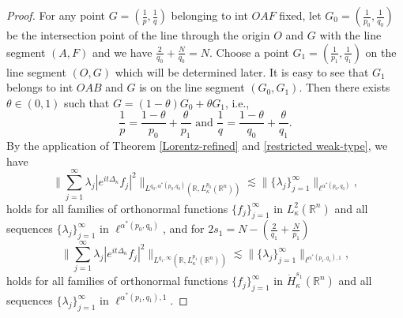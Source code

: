 \documentclass[a4paper,11pt, reqno]{amsart}
\numberwithin{equation}{section}
\theoremstyle{plain}
\theoremstyle{definition}
\theoremstyle{remark}
\begin{document}
\begin{proof}
    For any point $G=(\frac{1}{p},\frac{1}{q})$ belonging to int $OAF$ fixed, let $G_0=(\frac{1}{p_0},\frac{1}{q_0})$ be the intersection point of the line through the origin $O$ and $G$ with the line segment $(A,F)$ and we have $\frac{2}{q_0}+\frac{N}{q_0}=N$. Choose a point $G_1=(\frac{1}{p_1},\frac{1}{q_1})$ on the line segment $(O,G)$ which will be determined later. It is easy to see that $G_1$ belongs to int $OAB$ and $G$ is on the line segment $(G_0,G_1)$. Then there exists $\theta\in(0,1)$ such that $G=(1-\theta)G_0+\theta G_1$, i.e.,
    \begin{equation}\label{interpolation-index}
        \frac{1}{p}=\frac{1-\theta}{p_0}+\frac{\theta}{p_1} \text{ and }\frac{1}{q}=\frac{1-\theta}{q_0}+\frac{\theta}{q_1}. 
    \end{equation}
By the application of Theorem \ref{Lorentz-refined} and \ref{restricted weak-type}, we have 
\begin{equation*}
 \bigg\|\sum_{j=1}^\infty \lambda_j|e^{it\Delta_\kappa}f_j|^2\bigg\|_{L^{q_0,\alpha^*(p_0,q_0)}(\mathbb{R}, L_\kappa^{p_0}(\mathbb{R}^n))}\lesssim \|\{\lambda_j\}^\infty_{j=1}\|_{\ell^{\alpha^*(p_0,q_0)}},
\end{equation*}
 holds for all families of orthonormal functions $\{f_j\}_{j=1}^\infty$ in $L_\kappa^2(\mathbb{R}^n)$ and all sequences $\{\lambda_j\}^\infty_{j=1}$ in $\ell^{\alpha^*(p_0,q_0)}$,
 and for $2s_1=N-\left(\frac{2}{q_1}+\frac{N}{p_1}\right)$
\begin{equation*}
 \bigg\|\sum_{j=1}^\infty \lambda_j|e^{it\Delta_\kappa}f_j|^2\bigg\|_{L^{q_1,\infty}(\mathbb{R}, L_\kappa^{p_1}(\mathbb{R}^n))}\lesssim \|\{\lambda_j\}^\infty_{j=1}\|_{\ell^{\alpha^*(p_1,q_1),1}},  
\end{equation*}
holds for all families of orthonormal functions $\{f_j\}_{j=1}^\infty$ in $\dot{H}_\kappa^{s_1}(\mathbb{R}^n)$ and all sequences $\{\lambda_j\}^\infty_{j=1}$ in $\ell^{\alpha^*(p_1,q_1),1}$.


\end{proof}
\end{document}
